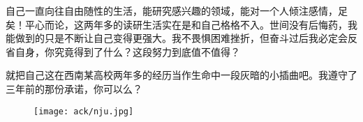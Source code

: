 \begin{thanks}
自己一直向往自由随性的生活，能研究感兴趣的领域，能对一个人倾注感情，足矣！平心而论，这两年多的读研生活实在是和自己格格不入。世间没有后悔药，我能做到的只是不断让自己变得更强大。我不畏惧困难挫折，但奋斗过后我必定会反省自身，你究竟得到了什么？这段努力到底值不值得？

就把自己这在西南某高校两年多的经历当作生命中一段灰暗的小插曲吧。我遵守了三年前的那份承诺，你可以么？

\begin{figure}[!htbp]
  \centering
  \texttt{[image: ack/nju.jpg]}
\end{figure}

\end{thanks}
